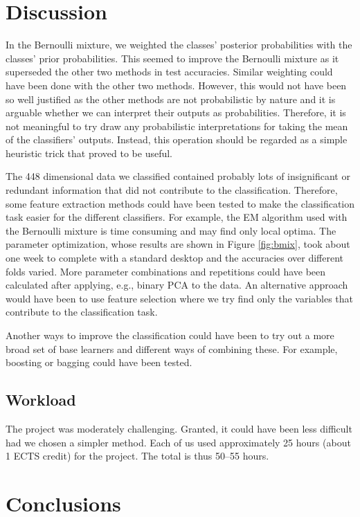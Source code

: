 \section{Discussion} \label{sec:discussion}

In the Bernoulli mixture, we weighted the classes' posterior
probabilities with the classes' prior probabilities. This seemed to
improve the Bernoulli mixture as it superseded the other two methods in
test accuracies. Similar weighting could have been done with the other
two methods. However, this would not have been so well justified as the
other methods are not probabilistic by nature and it is arguable whether
we can interpret their outputs as probabilities. Therefore, it is not
meaningful to try draw any probabilistic interpretations for taking the
mean of the classifiers' outputs. Instead, this operation should be
regarded as a simple heuristic trick that proved to be useful.

The 448 dimensional data we classified contained probably lots of
insignificant or redundant information that did not contribute to the
classification. Therefore, some feature extraction methods could have
been tested to make the classification task easier for the different
classifiers. For example, the EM algorithm used with the Bernoulli
mixture is time consuming and may find only local optima. The parameter
optimization, whose results are shown in Figure \ref{fig:bmix}, took
about one week to complete with a standard desktop and the accuracies
over different folds varied. More parameter combinations and repetitions
could have been calculated after applying, e.g., binary PCA to the data.
An alternative approach would have been to use feature selection where
we try find only the variables that contribute to the classification
task.

Another ways to improve the classification could have been to try out a
more broad set of base learners and different ways of combining these.
For example, boosting or bagging could have been tested.

\subsection{Workload}

The project was moderately challenging. Granted, it could have been less difficult had we chosen a simpler method. Each of us used approximately 25 hours (about 1 ECTS credit) for the project. The total is thus 50--55 hours.

\section{Conclusions}

